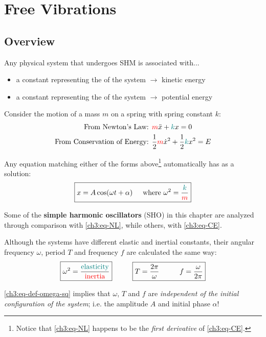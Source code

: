 \chapter{Free Vibrations} \label{ch:free-vibrations}

\section{Overview} \label{ch3:sec-simple-springs}
Any physical system that undergoes SHM is associated with...
\begin{itemize}
	\item a constant representing the  of the system $\longrightarrow$ kinetic energy
	\item a constant representing the  of the system $\longrightarrow$ potential energy
\end{itemize}

Consider the motion of a mass $m$ on a spring with spring constant $k$:
\begin{align}
	\text{From Newton's Law: }&
	\textcolor{red}{m}\ddot{x} + \textcolor{teal}{k}x = 0 \label{ch3:eq-NL} \\
	\text{From Conservation of Energy: }&
	\frac{1}{2}\textcolor{red}{m}\dot{x}^2 + \frac{1}{2}\textcolor{teal}{k}x^2 = E \label{ch3:eq-CE}
\end{align}

Any equation matching either of the forms above\footnote{Notice that \eqref{ch3:eq-NL} happens to be the \textit{first derivative} of  \eqref{ch3:eq-CE}.} automatically has as a solution:
\begin{equation}
\boxed{x = A \cos(\omega t+\alpha)\hspace{0.5cm}\text{where }\omega^2 = \frac{\textcolor{teal}{k}}{\textcolor{red}{m}}} \label{ch3:eq-SHM-soln}
\end{equation}

Some of the \textbf{simple harmonic oscillators} (SHO) in this chapter are analyzed through comparison with \eqref{ch3:eq-NL}, while others, with \eqref{ch3:eq-CE}. 

Although the systems have different elastic and inertial constants, their angular frequency $\omega$, period $T$ and frequency $f$ are calculated the same way:
\begin{equation}
	\boxed{
		\omega^2 = \frac{\kcol{\text{elasticity}}}{\mcol{\text{inertia}}} 
	}
	\hhtab 
	\boxed{
		T = \frac{2\pi}{\omega} \hhtab 
		f = \frac{\omega}{2\pi}}
	\label{ch3:eq-def-omega-sq}
\end{equation}

\eqref{ch3:eq-def-omega-sq} implies that $\omega$, $T$ and $f$ are \emph{independent of the initial configuration of the system}; i.e. the amplitude $A$ and initial phase $\alpha$!

